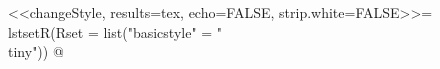 <<changeStyle, results=tex, echo=FALSE, strip.white=FALSE>>=
lstsetR(Rset = list("basicstyle" = "{\\tiny}"))
@
